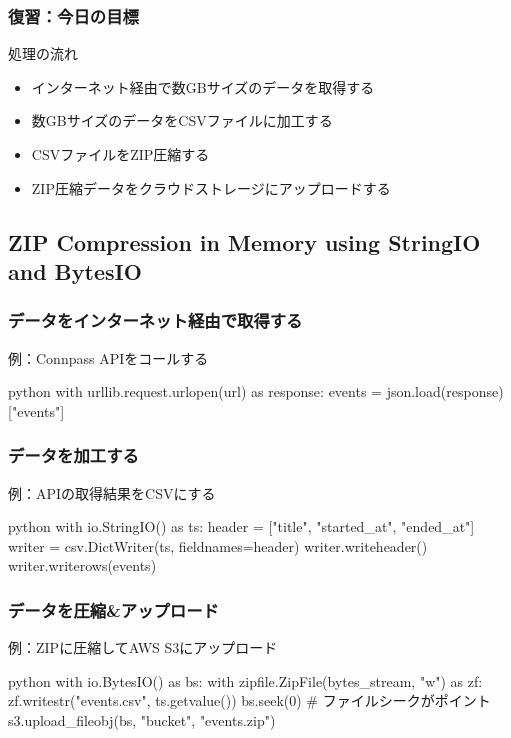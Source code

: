 \documentclass[aspectratio=169,dvipdfmx,14pt,notheorems]{beamer}
\theoremstyle{definition}
\begin{document}
\begin{frame}\frametitle{復習：今日の目標}
\begin{block}{処理の流れ}
\begin{itemize}
\item インターネット経由で数GBサイズのデータを取得する
\item 数GBサイズのデータをCSVファイルに加工する
\item CSVファイルをZIP圧縮する
\item ZIP圧縮データをクラウドストレージにアップロードする
\end{itemize}
\end{block}

\end{frame}

\subsection{ZIP Compression in Memory using StringIO and BytesIO}

\begin{frame}[fragile]\frametitle{データをインターネット経由で取得する}

\begin{exampleblock}{例：Connpass APIをコールする}
\begin{pygments}{python}
with urllib.request.urlopen(url) as response:
    events = json.load(response)["events"]
\end{pygments}
\end{exampleblock}

\end{frame}

\begin{frame}[fragile]\frametitle{データを加工する}

\begin{exampleblock}{例：APIの取得結果をCSVにする}
\begin{pygments}{python}
with io.StringIO() as ts:
    header = ["title", "started_at", "ended_at"]
    writer = csv.DictWriter(ts, fieldnames=header)
    writer.writeheader()
    writer.writerows(events)
\end{pygments}
\end{exampleblock}

\end{frame}

\begin{frame}[fragile]\frametitle{データを圧縮\&アップロード}

\begin{exampleblock}{例：ZIPに圧縮してAWS S3にアップロード}
\begin{pygments}{python}
with io.BytesIO() as bs:
    with zipfile.ZipFile(bytes_stream, "w") as zf:
        zf.writestr("events.csv", ts.getvalue())
    bs.seek(0)  # ファイルシークがポイント
    s3.upload_fileobj(bs, "bucket", "events.zip")
\end{pygments}
\end{exampleblock}

\end{frame}
\end{document}
